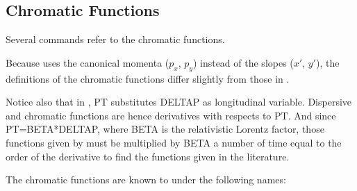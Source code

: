 

\subsection{Chromatic Functions} 
\label{subsec:tables_chrom}
Several \madx commands refer to the chromatic functions. 

Because \madx uses the canonical momenta ($p_x$, $p_y$) instead of the
slopes ($x'$, $y'$), the definitions of the chromatic functions differ
slightly from those in \cite{Montague1979}.

Notice also that in \madx, PT substitutes DELTAP as longitudinal
variable. Dispersive and chromatic functions are hence derivatives with
respects to PT. 
And since PT=BETA*DELTAP, where BETA is the relativistic Lorentz 
factor, those functions given by \madx must be multiplied by BETA a
number of time equal to the order of the derivative to find the
functions given in the literature. 

The chromatic functions are known to \madx under the following names:

